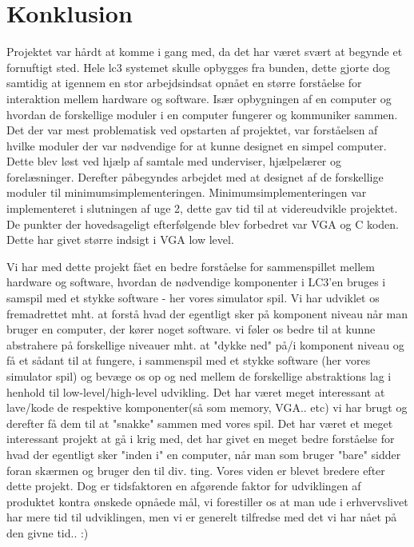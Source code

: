 \chapter{Konklusion}\label{cha:konklusion}

Projektet var hårdt at komme i gang med, da det har været svært at begynde et fornuftigt sted. Hele lc3 systemet skulle opbygges fra bunden, dette gjorte dog samtidig at igennem en stor arbejdsindsat opnået en større forståelse for interaktion mellem hardware og software. Især opbygningen af en computer og hvordan de forskellige moduler i en computer fungerer og kommuniker sammen. Det der var mest problematisk ved opstarten af projektet, var forståelsen af hvilke moduler der var nødvendige for at kunne designet en simpel computer. Dette blev løst ved hjælp af samtale med underviser, hjælpelærer og forelæsninger. Derefter påbegyndes arbejdet med at designet af de forskellige moduler til minimumsimplementeringen. Minimumsimplementeringen var implementeret i slutningen af uge 2, dette gav tid til at videreudvikle projektet. De punkter der hovedsageligt efterfølgende blev forbedret var VGA og C koden. Dette har givet større indsigt i VGA low level.



Vi har med dette projekt fået en bedre forståelse for sammenspillet mellem hardware og software, hvordan de nødvendige komponenter i LC3'en bruges i samspil med et stykke software - her vores simulator spil. Vi har udviklet os fremadrettet mht. at forstå hvad der egentligt sker på komponent niveau når man bruger en computer, der kører noget software. vi føler os bedre til at kunne abstrahere på forskellige niveauer mht. at "dykke ned" på/i komponent niveau og få et sådant til at fungere, i sammenspil med et stykke software (her vores simulator spil) og bevæge os op og ned mellem de forskellige abstraktions lag i henhold til low-level/high-level udvikling. Det har været meget interessant at lave/kode de respektive komponenter(så som memory, VGA.. etc) vi har brugt og derefter få dem til at "snakke" sammen med vores spil.
Det har været et meget interessant projekt at gå i krig med, det har givet en meget bedre forståelse for hvad der egentligt sker "inden i" en computer, når man som bruger "bare" sidder foran skærmen og bruger den til div. ting. Vores viden er blevet bredere efter dette projekt.
Dog er tidsfaktoren en afgørende faktor for udviklingen af produktet kontra ønskede opnåede mål, vi forestiller os at man ude i erhvervslivet har mere tid til udviklingen, men vi er generelt tilfredse med det vi har nået på den givne tid.. :) 